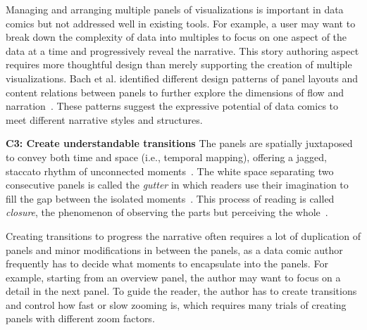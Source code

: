 Managing and arranging multiple panels of visualizations is important in data comics but not addressed well in existing tools. For example, a user may want to break down the complexity of data into multiples to focus on one aspect of the data at a time and progressively reveal the narrative. This story authoring aspect requires more thoughtful design than merely supporting the creation of multiple visualizations. Bach et al. identified different design patterns of panel layouts and content relations between panels to further explore the dimensions of flow and narration~\cite{bachdesign}. These patterns suggest the expressive potential of data comics to meet different narrative styles and structures. 



\textbf{C3: Create understandable transitions}
The panels are spatially juxtaposed to convey both time and space (i.e., temporal mapping), offering a jagged, staccato rhythm of unconnected moments~\cite{mccloud1993understanding}. The white space separating two consecutive panels is called the \textit{gutter} in which readers use their imagination to fill the gap between the isolated moments~\cite{mccloud1993understanding}. This process of reading is called \textit{closure}, the phenomenon of observing the parts but perceiving the whole~\cite{mccloud1993understanding,duncan2015power}.

Creating transitions to progress the narrative often requires a lot of duplication of panels and minor modifications in between the panels, as a data comic author frequently has to decide what moments to encapsulate into the panels. For example, starting from an overview panel, the author may want to focus on a detail in the next panel. To guide the reader, the author has to create transitions and control how fast or slow zooming is, which requires many trials of creating panels with different zoom factors. 




